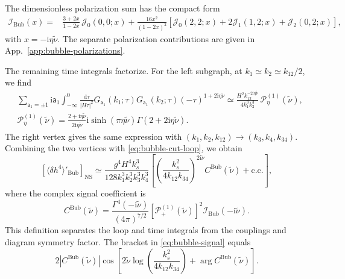 \documentclass[a4paper,12pt]{article}
\def\di{{\mathrm{d}}}
\def\to{\rightarrow}
\def\ii{\mathrm{i}}
\def\aa{\mathsf{a}}
\begin{document}
The dimensionless polarization sum has the compact form
\begin{align}
    \mathcal I_{\mathrm{Bub}}(x)
    ={}&\frac{3+2x}{1-2x}\,\mathcal J_0(0,0;x)
    +\frac{16x^2}{(1-2x)^2}
    \left[\mathcal J_0(2,2;x)+2\mathcal J_1(1,2;x)
    +\mathcal J_2(0,2;x)\right],
    \label{eq:bubble-polarization-sum}
\end{align}
with $x=-\ii\eta\tilde\nu$.
The separate polarization contributions are given in App.~\ref{app:bubble-polarizations}.

The remaining time integrals factorize.
For the left subgraph, at $k_1\simeq k_2\simeq k_{12}/2$, we find
\begin{align}
    &\sum_{\aa_1=\pm1}\ii\aa_1
    \int_{-\infty}^{0}\frac{\di\tau}{|H\tau|^2}
    G_{\aa_1}(k_1;\tau)G_{\aa_1}(k_2;\tau)
    (-\tau)^{1+2\ii\eta\tilde\nu}
    \simeq\frac{H^2k_{12}^{-2\ii\eta\tilde\nu}}
    {4k_1^3k_2^3}\,\mathcal P^{(1)}_{\eta}(\tilde\nu),
    \label{eq:bubble-time-integral}\\
    &\mathcal P^{(1)}_{\eta}(\tilde\nu)
    =\frac{2+\ii\eta\tilde\nu}{2\ii\eta\tilde\nu}
    \ii\sinh(\pi\eta\tilde\nu)\Gamma(2+2\ii\eta\tilde\nu).
    \label{eq:bubble-P1}
\end{align}
The right vertex gives the same expression with $(k_1,k_2,k_{12})\to(k_3,k_4,k_{34})$.
Combining the two vertices with \eqref{eq:bubble-cut-loop}, we obtain
\begin{equation}
    \left[\langle\delta h^4\rangle'_{\mathrm{Bub}}\right]_{\mathrm{NS}}
    \simeq\frac{g^4H^4k_s^3}
    {128k_1^3k_2^3k_3^3k_4^3}
    \left[
    \left(\frac{k_s^2}{4k_{12}k_{34}}\right)^{2\ii\tilde\nu}
    C^{\mathrm{Bub}}(\tilde\nu)+\text{c.c.}\right],
    \label{eq:bubble-signal}
\end{equation}
where the complex signal coefficient is
\begin{equation}
    C^{\mathrm{Bub}}(\tilde\nu)
    =\frac{\Gamma^4(-\ii\tilde\nu)}{(4\pi)^{7/2}}
    \left[\mathcal P^{(1)}_{+}(\tilde\nu)\right]^2
    \mathcal I_{\mathrm{Bub}}(-\ii\tilde\nu).
    \label{eq:bubble-coefficient}
\end{equation}
This definition separates the loop and time integrals from the couplings and diagram symmetry factor.
The bracket in \eqref{eq:bubble-signal} equals
\begin{equation}
    2|C^{\mathrm{Bub}}(\tilde\nu)|
    \cos\left[
    2\tilde\nu\log\!\left(\frac{k_s^2}{4k_{12}k_{34}}\right)
    +\arg C^{\mathrm{Bub}}(\tilde\nu)\right].
    \label{eq:bubble-phase}
\end{equation}
\end{document}
